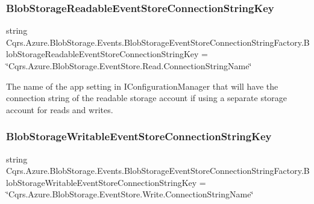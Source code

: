 \subsubsection{\texorpdfstring{Blob\+Storage\+Readable\+Event\+Store\+Connection\+String\+Key}{BlobStorageReadableEventStoreConnectionStringKey}}
{\footnotesize\ttfamily string Cqrs.\+Azure.\+Blob\+Storage.\+Events.\+Blob\+Storage\+Event\+Store\+Connection\+String\+Factory.\+Blob\+Storage\+Readable\+Event\+Store\+Connection\+String\+Key = \char`\"{}Cqrs.\+Azure.\+Blob\+Storage.\+Event\+Store.\+Read.\+Connection\+String\+Name\char`\"{}\hspace{0.3cm}{\ttfamily [static]}}



The name of the app setting in I\+Configuration\+Manager that will have the connection string of the readable storage account if using a separate storage account for reads and writes. 

\mbox{\label{classCqrs_1_1Azure_1_1BlobStorage_1_1Events_1_1BlobStorageEventStoreConnectionStringFactory_a3bf39254f211e4fbcbd9bc108c8d9fbc_a3bf39254f211e4fbcbd9bc108c8d9fbc}} 
\subsubsection{\texorpdfstring{Blob\+Storage\+Writable\+Event\+Store\+Connection\+String\+Key}{BlobStorageWritableEventStoreConnectionStringKey}}
{\footnotesize\ttfamily string Cqrs.\+Azure.\+Blob\+Storage.\+Events.\+Blob\+Storage\+Event\+Store\+Connection\+String\+Factory.\+Blob\+Storage\+Writable\+Event\+Store\+Connection\+String\+Key = \char`\"{}Cqrs.\+Azure.\+Blob\+Storage.\+Event\+Store.\+Write.\+Connection\+String\+Name\char`\"{}\hspace{0.3cm}{\ttfamily [static]}}



